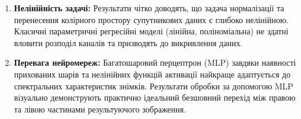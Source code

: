 \clearpage
\chapterConclusion
\begin{enumerate}
	\item \textbf{Нелінійність задачі:} Результати чітко доводять, що задача нормалізації
		та перенесення колірного простору супутникових даних є глибоко нелінійною.
		Класичні параметричні регресійні моделі (лінійна, поліноміальна) не здатні вловити
		розподіл каналів та призводять до викривлення даних.

	\item \textbf{Перевага нейромереж:} Багатошаровий перцептрон (MLP) завдяки
		наявності прихованих шарів та нелінійних функцій активації найкраще
		адаптується до спектральних характеристик знімків. Результати обробки за допомогою
		MLP візуально демонструють практично ідеальний безшовний перехід між правою та
		лівою частинами результуючого зображення.
\end{enumerate}